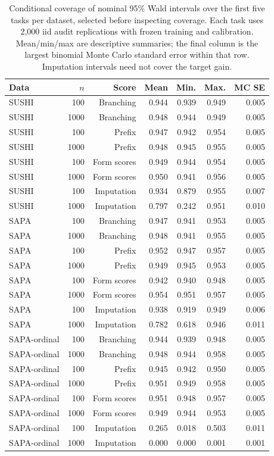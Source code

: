\begin{table}[t]
\centering
\caption{Conditional coverage of nominal 95\% Wald intervals over the first five tasks per dataset, selected before inspecting coverage. Each task uses 2,000 iid audit replications with frozen training and calibration. Mean/min/max are descriptive summaries; the final column is the largest binomial Monte Carlo standard error within that row. Imputation intervals need not cover the target gain.}
\label{tab:coverage}
\small
\setlength{\tabcolsep}{4pt}
\begin{tabular}{lrrrrrr}
\toprule
Data & $n$ & Score & Mean & Min. & Max. & MC SE \\
\midrule
SUSHI & 100 & Branching & 0.944 & 0.939 & 0.949 & 0.005 \\
SUSHI & 1000 & Branching & 0.948 & 0.944 & 0.949 & 0.005 \\
SUSHI & 100 & Prefix & 0.947 & 0.942 & 0.954 & 0.005 \\
SUSHI & 1000 & Prefix & 0.948 & 0.945 & 0.955 & 0.005 \\
SUSHI & 100 & Form scores & 0.949 & 0.944 & 0.954 & 0.005 \\
SUSHI & 1000 & Form scores & 0.950 & 0.941 & 0.956 & 0.005 \\
SUSHI & 100 & Imputation & 0.934 & 0.879 & 0.955 & 0.007 \\
SUSHI & 1000 & Imputation & 0.797 & 0.242 & 0.951 & 0.010 \\
SAPA & 100 & Branching & 0.947 & 0.941 & 0.953 & 0.005 \\
SAPA & 1000 & Branching & 0.948 & 0.941 & 0.955 & 0.005 \\
SAPA & 100 & Prefix & 0.952 & 0.947 & 0.957 & 0.005 \\
SAPA & 1000 & Prefix & 0.949 & 0.945 & 0.953 & 0.005 \\
SAPA & 100 & Form scores & 0.942 & 0.940 & 0.948 & 0.005 \\
SAPA & 1000 & Form scores & 0.954 & 0.951 & 0.957 & 0.005 \\
SAPA & 100 & Imputation & 0.938 & 0.919 & 0.949 & 0.006 \\
SAPA & 1000 & Imputation & 0.782 & 0.618 & 0.946 & 0.011 \\
SAPA-ordinal & 100 & Branching & 0.944 & 0.939 & 0.948 & 0.005 \\
SAPA-ordinal & 1000 & Branching & 0.948 & 0.944 & 0.958 & 0.005 \\
SAPA-ordinal & 100 & Prefix & 0.945 & 0.942 & 0.950 & 0.005 \\
SAPA-ordinal & 1000 & Prefix & 0.951 & 0.949 & 0.958 & 0.005 \\
SAPA-ordinal & 100 & Form scores & 0.951 & 0.948 & 0.957 & 0.005 \\
SAPA-ordinal & 1000 & Form scores & 0.949 & 0.944 & 0.953 & 0.005 \\
SAPA-ordinal & 100 & Imputation & 0.265 & 0.018 & 0.503 & 0.011 \\
SAPA-ordinal & 1000 & Imputation & 0.000 & 0.000 & 0.001 & 0.001 \\
\bottomrule
\end{tabular}
\end{table}
